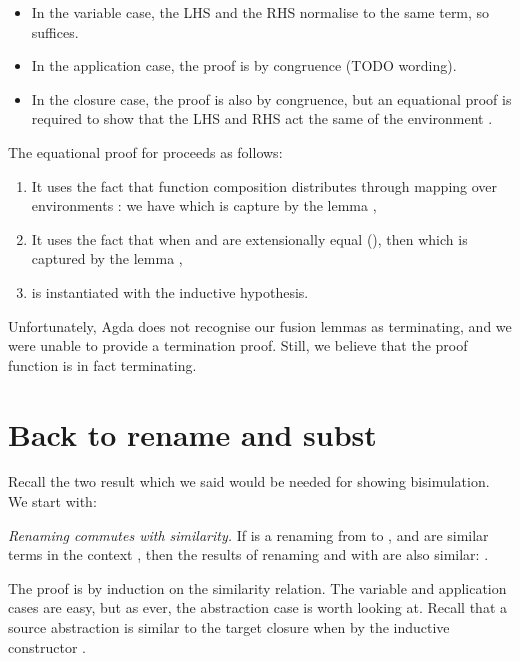 \documentclass[bsc,frontabs,twoside,singlespacing,parskip,deptreport]{infthesis}
\theoremstyle{definition}
\begin{document}
\begin{itemize}
\item In the variable case, the LHS and the RHS normalise to the same
  term, so  suffices.
\item In the application case, the proof is by congruence (TODO
  wording).
\item In the closure case, the proof is also by congruence, but
  an equational proof is required to show that the LHS and RHS act the
  same of the environment .
\end{itemize}

The equational proof for  proceeds as follows:

\begin{enumerate}
\item It uses the fact that function composition 
  distributes through mapping over environments \AS{\_<\$>\_}: we have
   which is capture by the lemma
  ,
\item It uses the fact that when  and  are extensionally
  equal (), then  which
  is captured by the lemma ,
\item {} is instantiated with the inductive hypothesis.
\end{enumerate}

Unfortunately, Agda does not recognise our fusion lemmas as
terminating, and we were unable to provide a termination proof. Still,
we believe that the proof function is in fact terminating.

\section{Back to \ti rename and \ti subst}

Recall the two result which we said would be needed for showing
bisimulation. We start with:

\textit{Renaming commutes with similarity.} If  is a renaming from
 to , and  are similar terms in the context
, then the results of renaming  and  with 
are also similar: .


The proof is by induction on the similarity relation. The variable and
application cases are easy, but as ever, the abstraction case is worth
looking at. Recall that a source abstraction is similar to the target
closure  when 
by the inductive constructor .
\end{document}
